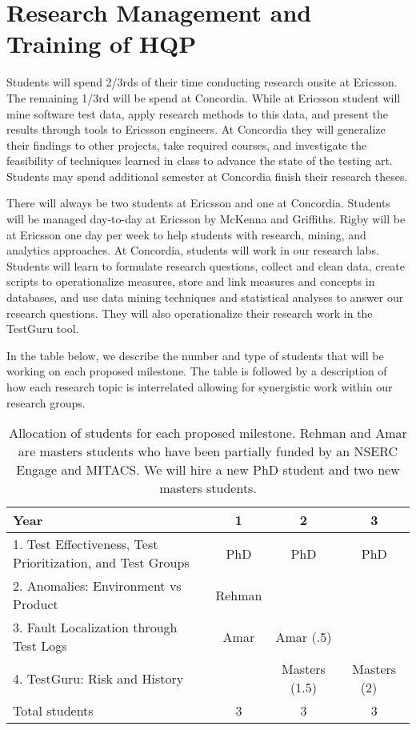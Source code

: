 \section*{Research Management and Training of HQP}

Students will spend 2/3rds of their time conducting research onsite at Ericsson. The remaining 1/3rd will be spend at Concordia. While at Ericsson student will mine software test data, apply research methods to this data, and present the results through tools to Ericsson engineers. At Concordia they will generalize their findings to other projects, take required courses, and investigate the feasibility of techniques learned in class to advance the state of the testing art. Students may spend additional semester at Concordia finish their research theses.

There will always be two students at Ericsson and one at Concordia. Students will be managed day-to-day at Ericsson by McKenna and Griffiths. Rigby will be at Ericsson one day per week to help students with research, mining, and analytics approaches. At Concordia, students will work in our research labs.
%
Students will learn to formulate research questions, collect and clean data, create scripts to operationalize measures, store and link measures and concepts in databases, and use  data mining techniques and statistical analyses to answer our research questions. They will also operationalize their research work in the TestGuru tool.

In the table below, we describe the number and type of students that will be working on each proposed milestone. The table is followed by a description of how each research topic is interrelated allowing for synergistic work within our research groups.

\begin{table}[h]
\center
\caption{Allocation of students for each proposed milestone. Rehman and Amar are masters students who have been partially funded by an NSERC Engage and MITACS. We will hire a new PhD student and two new masters students.}
\label{tableHQP}
\vspace{+3mm}

\begin{tabular}{  l | c | c | c  }
\hline
	\textbf{Year} & 1 & 2 & 3 \\ \hline
	1. Test Effectiveness, Test Prioritization, and Test Groups & PhD & PhD & PhD \\ 
	2. Anomalies: Environment vs Product & Rehman &  & \  \\ 
	3. Fault Localization through Test Logs & Amar & Amar (.5) & \  \\ 
	4. TestGuru: Risk and History & & Masters (1.5) &  Masters (2)  \  \\ \hline
	Total students & 3 & 3 & 3 \\ \hline

\end{tabular}

\end{table}

